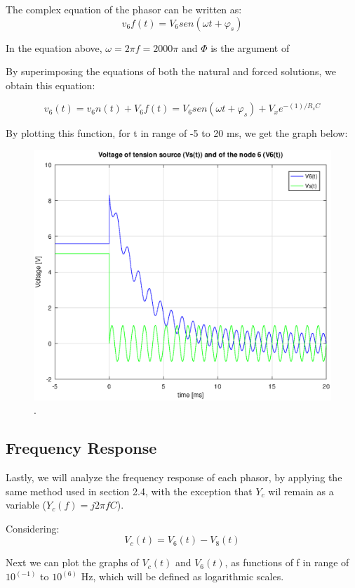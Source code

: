 The complex equation of the phasor can be written as:
\begin{equation}
	v_6f(t) = V_6sen(\omega t + \varphi_s)
\end{equation}

In the equation above, $\omega = 2\pi f = 2000\pi$ and $\varPhi$ is the argument of 

By superimposing the equations of both the natural and forced solutions, we obtain this equation:

\begin{equation}
	v_6(t) = v_6n(t) + V_6f(t) = V_6sen(\omega t + \varphi_s) + V_xe^{-(1)/R_sC}
\end{equation}

By plotting this function, for t in range of -5 to 20 ms, we get the graph below:

\begin{figure}[H] \centering
\includegraphics[width=0.6\linewidth]{forced_solution.eps}
\caption{.}
\label{fig:rc2}
\end{figure}



\subsection{Frequency Response}

Lastly, we will analyze the frequency response of each phasor, by applying the same method used in section 2.4, with the exception that $Y_c$ wil remain as a variable ($Y_c(f) = j2\pi fC$).

Considering:
\begin{equation}
	V_c(t) = V_6(t) - V_8(t)
\end{equation} 

Next we can plot the graphs of $V_c(t)$ and $V_6(t)$, as functions of f in range of $10^(-1)$ to $10^(6)$ Hz, which will be defined as logarithmic scales.


